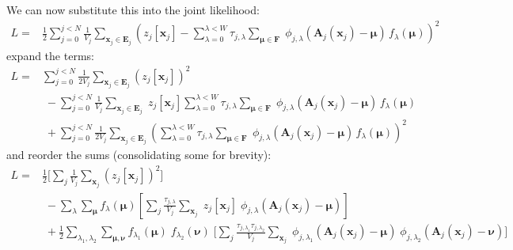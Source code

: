 \documentclass[DM,authoryear,toc]{lsstdoc}
\begin{document}
We can now substitute this into the joint likelihood:
\begin{align}
L = &
    \frac{1}{2} \sum_{j=0}^{j<N}
        \frac{1}{V_j}
        \sum_{\bm{x}_j \in \bm{E}_j}
        \left(
            z_j[\bm{x}_j]
            - \sum_{\lambda=0}^{\lambda < W}
                \tau_{j,\lambda}
                \sum_{\bm{\mu} \in \bm{F}}
                        \;\phi_{j,\lambda}\!\left(
                            \bm{A}_j(\bm{x}_j) - \bm{\mu}
                        \right)
                        \, f_{\lambda}(\bm{\mu})
        \right)^2
\end{align}
expand the terms:
\begin{align}
L =&
        \sum_{j=0}^{j<N}
        \frac{1}{2V_j}
        \sum_{\bm{x}_j \in \bm{E}_j}
        \left(z_j[\bm{x}_j]\right)^2
\nonumber\\
&\;-
    \sum_{j=0}^{j<N}
        \frac{1}{V_j}
        \sum_{\bm{x}_j \in \bm{E}_j}
        \; z_j[\bm{x}_j]
        \sum_{\lambda=0}^{\lambda < W}
            \tau_{j,\lambda}
            \sum_{\bm{\mu} \in \bm{F}}
                    \;\phi_{j,\lambda}\!\left(
                        \bm{A}_j(\bm{x}_j) - \bm{\mu}
                    \right)
                    \, f_{\lambda}(\bm{\mu})
\nonumber\\
&\;+
    \sum_{j=0}^{j<N}
        \frac{1}{2V_j}
        \sum_{\bm{x}_j \in \bm{E}_j}
        \left(
            \sum_{\lambda=0}^{\lambda < W}
                \tau_{j,\lambda}
                \sum_{\bm{\mu} \in \bm{F}}
                        \;\phi_{j,\lambda}\!\left(
                            \bm{A}_j(\bm{x}_j) - \bm{\mu}
                        \right)
                        \, f_{\lambda}(\bm{\mu})
        \right)^2
\end{align}
and reorder the sums (consolidating some for brevity):
\begin{align}
L =&
    \frac{1}{2}
        \Bigg[
            \sum_{j}
            \frac{1}{V_j}
            \sum_{\bm{x}_j}
            \left(z_j[\bm{x}_j]\right)^2
        \Bigg]
    \nonumber\\
&\; -
    \sum_{\lambda}
    \sum_{\bm{\mu}}
    f_{\lambda}(\bm{\mu})
    \left[
        \sum_{j}
        \frac{\tau_{j,\lambda}}{V_j}
        \sum_{\bm{x}_j}
            \; z_j[\bm{x}_j]
            \; \phi_{j,\lambda}\!\left(
                \bm{A}_j(\bm{x}_j) - \bm{\mu}
            \right)
    \right]
    \nonumber\\
&\; +
    \frac{1}{2}
        \sum_{\lambda_1,\lambda_2}
        \sum_{\bm{\mu},\bm{\nu}}
        f_{\lambda_1}(\bm{\mu}) \;
        f_{\lambda_2}(\bm{\nu}) \;
        \Bigg[
        \sum_{j}
            \frac{
                \tau_{j,\lambda_1}
                \tau_{j,\lambda_2}
            }{
                V_j
            }
            \sum_{\bm{x}_j}
            \; \phi_{j,\lambda_1}\!\left(
                \bm{A}_j(\bm{x}_j) - \bm{\mu}
            \right)
            \; \phi_{j,\lambda_2}\!\left(
                \bm{A}_j(\bm{x}_j) - \bm{\nu}
            \right)
        \Bigg]
\end{align}
\end{document}
